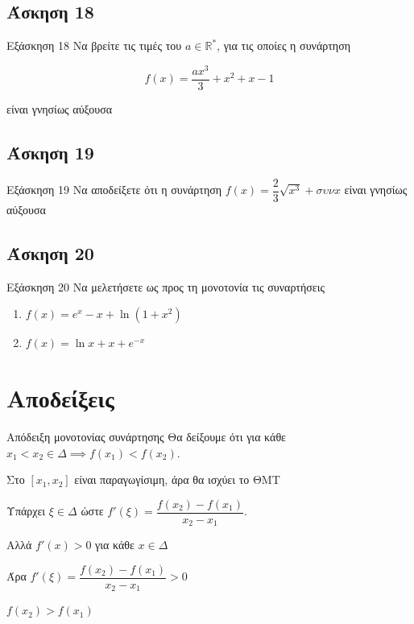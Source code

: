 \documentclass[greek]{beamer}
\begin{document}
\subsection{Άσκηση 18}
\begin{frame}[label=Άσκηση18]{Εξάσκηση 18}
  Να βρείτε τις τιμές του $a\in \mathbb{R}^*$, για τις οποίες η συνάρτηση

  $$f(x)=\dfrac{ax^3}{3}+x^2+x-1$$

  είναι γνησίως αύξουσα

\end{frame}

\subsection{Άσκηση 19}
\begin{frame}[label=Άσκηση19]{Εξάσκηση 19}
  Να αποδείξετε ότι η συνάρτηση $f(x)=\dfrac{2}{3}\sqrt{x^3}+συνx$ είναι γνησίως αύξουσα

\end{frame}

\subsection{Άσκηση 20}
\begin{frame}[label=Άσκηση20]{Εξάσκηση 20}
  Να μελετήσετε ως προς τη μονοτονία τις συναρτήσεις
  \begin{enumerate}
    \item<1-> $f(x)=e^x-x+\ln (1+x^2)$
    \item<2-> $f(x)=\ln x+x+e^{-x}$
  \end{enumerate}

\end{frame}


\appendix

\section{Αποδείξεις}
\begin{frame}[label=Απόδειξη1]{Απόδειξη μονοτονίας συνάρτησης}
  Θα δείξουμε ότι για κάθε $x_1<x_2\in Δ \implies f(x_1)<f(x_2)$.

   Στο $[x_1,x_2]$ είναι παραγωγίσιμη, άρα θα ισχύει το ΘΜΤ

   Υπάρχει $ξ\in Δ$ ώστε $f'(ξ)=\dfrac{f(x_2)-f(x_1)}{x_2-x_1}$.

   Αλλά $f'(x)>0$ για κάθε $x\in Δ$

   Άρα $f'(ξ)=\dfrac{f(x_2)-f(x_1)}{x_2-x_1}>0$

   $f(x_2)>f(x_1)$

  \hyperlink{Θεώρημα1}{}
\end{frame}
\end{document}
